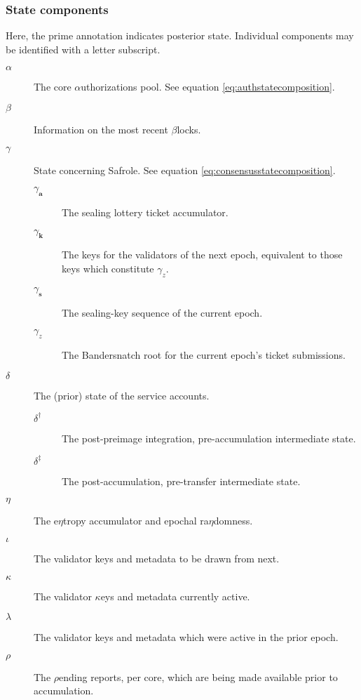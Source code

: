 \subsubsection{State components}

Here, the prime annotation indicates posterior state. Individual components may be identified with a letter subscript.
\begin{description}
  \item[$\alpha$] The core $\alpha$uthorizations pool. See equation \ref{eq:authstatecomposition}. %
  \item[$\beta$] Information on the most recent $\beta$locks. %
  \item[$\gamma$] State concerning Safrole. See equation \ref{eq:consensusstatecomposition}. %
  \begin{description}
    \item[$\gamma_\mathbf{a}$] The sealing lottery ticket accumulator.
    \item[$\gamma_\mathbf{k}$] The keys for the validators of the next epoch, equivalent to those keys which constitute $\gamma_z$.
    \item[$\gamma_\mathbf{s}$] The sealing-key sequence of the current epoch.
    \item[$\gamma_z$] The Bandersnatch root for the current epoch's ticket submissions.
  \end{description}
  \item[$\delta$] The (prior) state of the service accounts. %
  \begin{description}
    \item[$\delta^\dagger$] The post-preimage integration, pre-accumulation intermediate state. %
    \item[$\delta^\ddagger$] The post-accumulation, pre-transfer intermediate state. %
  \end{description}
  \item[$\eta$] The e$\eta$tropy accumulator and epochal ra$\eta$domness. %
  \item[$\iota$] The validator keys and metadata to be drawn from next. %
  \item[$\kappa$] The validator $\kappa$eys and metadata currently active. %
  \item[$\lambda$] The validator keys and metadata which were active in the prior epoch. %
  \item[$\rho$] The $\rho$ending reports, per core, which are being made available prior to accumulation. %
  \begin{description}

\end{description}
\end{description}
